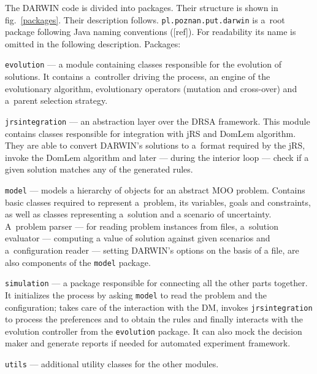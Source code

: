 The DARWIN code is divided into packages. Their structure is shown in
fig.~\ref{packages}. Their description follows. \texttt{pl.poznan.put.darwin}
is a~root package following Java naming conventions ([ref]). For readability
its name is omitted in the following description. Packages:
\begin{description}
  \item{\texttt{evolution}} --- a module containing classes responsible for
    the evolution of solutions. It contains a~controller driving the process,
    an engine of the evolutionary algorithm, evolutionary operators (mutation
    and cross-over) and a~parent selection strategy.

  \item{\texttt{jrsintegration}} --- an abstraction layer over the DRSA
    framework. This module contains classes responsible for integration with
    jRS and DomLem algorithm. They are able to convert DARWIN's solutions to
    a~format required by the jRS, invoke the DomLem algorithm and later ---
    during the interior loop --- check if a given solution matches any of the
    generated rules.

  \item{\texttt{model}} --- models a hierarchy of objects for an abstract MOO
    problem. Contains basic classes required to represent a~problem, its
    variables, goals and constraints, as well as classes representing
    a~solution and a scenario of uncertainty. A~problem parser --- for reading
    problem instances from files, a~solution evaluator --- computing a value
    of solution against given scenarios and a~configuration reader --- setting
    DARWIN's options on the basis of a file, are also components of the
    \texttt{model} package.
  \item{\texttt{simulation}} --- a package responsible for connecting all the
    other parts together. It initializes the process by asking \texttt{model}
    to read the problem and the configuration; takes care of the interaction
    with the DM, invokes \texttt{jrsintegration} to process the preferences
    and to obtain the rules and finally interacts with the evolution
    controller from the \texttt{evolution} package. It can also mock the
    decision maker and generate reports if needed for automated experiment
    framework.

  \item{\texttt{utils}} --- additional utility classes for the other modules.
\end{description}

